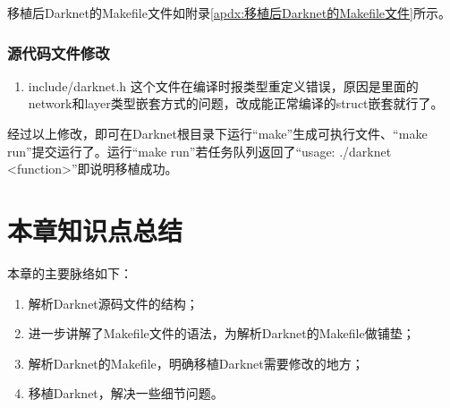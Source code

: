 移植后Darknet的Makefile文件如附录\ref{apdx:移植后Darknet的Makefile文件}所示。

\subsubsection{源代码文件修改}
\begin{enumerate}
	\item include/darknet.h
	      这个文件在编译时报类型重定义错误，原因是里面的network和layer类型嵌套方式的问题，改成能正常编译的struct嵌套就行了。
\end{enumerate}

经过以上修改，即可在Darknet根目录下运行“make”生成可执行文件、“make run”提交运行了。运行“make run”若任务队列返回了“usage: ./darknet <function>”即说明移植成功。

\section{本章知识点总结}
本章的主要脉络如下：
\begin{enumerate}
	\item 解析Darknet源码文件的结构；
	\item 进一步讲解了Makefile文件的语法，为解析Darknet的Makefile做铺垫；
	\item 解析Darknet的Makefile，明确移植Darknet需要修改的地方；
	\item 移植Darknet，解决一些细节问题。
\end{enumerate}
